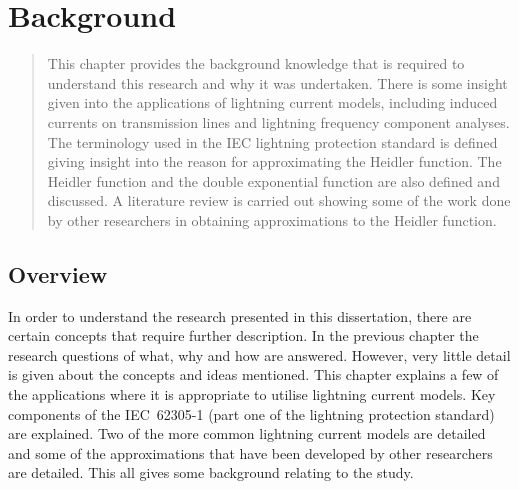 
\chapter{Background} %

\label{ChapterBackground} %

\begin{quote}
This chapter provides the background knowledge that is required to understand this research and why it was undertaken. There is some insight given into the applications of lightning current models, including induced currents on transmission lines and lightning frequency component analyses. The terminology used in the IEC lightning protection standard is defined giving insight into the reason for approximating the Heidler function. The Heidler function and the double exponential function are also defined and discussed. A literature review is carried out showing some of the work done by other researchers in obtaining approximations to the Heidler function.
\end{quote}


\section{Overview}
\label{sec:background_overview}
In order to understand the research presented in this dissertation, there are certain concepts that require further description. In the previous chapter the research questions of what, why and how are answered. However, very little detail is given about the concepts and ideas mentioned. This chapter explains a few of the applications where it is appropriate to utilise lightning current models. Key components of the IEC~62305-1 (part one of the lightning protection standard) are explained. Two of the more common lightning current models are detailed and some of the approximations that have been developed by other researchers are detailed. This all gives some background relating to the study.

